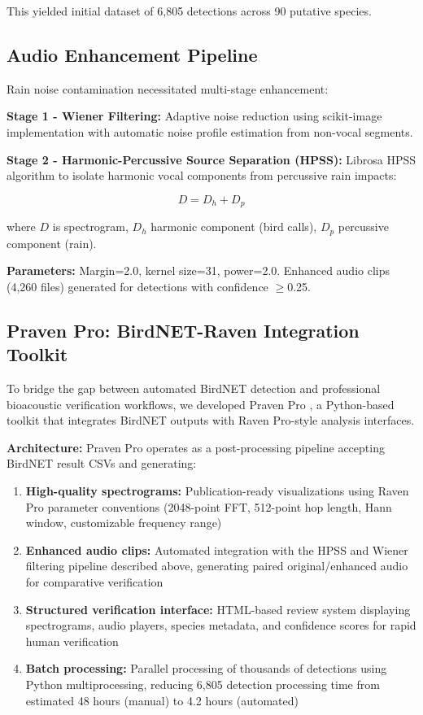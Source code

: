 \documentclass[twocolumn]{article}
\begin{document}
This yielded initial dataset of 6,805 detections across 90 putative species.

\subsection{Audio Enhancement Pipeline}

Rain noise contamination necessitated multi-stage enhancement:

\textbf{Stage 1 - Wiener Filtering:} Adaptive noise reduction using scikit-image implementation with automatic noise profile estimation from non-vocal segments.

\textbf{Stage 2 - Harmonic-Percussive Source Separation (HPSS):} Librosa HPSS algorithm \citep{Fitzgerald2010} to isolate harmonic vocal components from percussive rain impacts:

\begin{equation}
D = D_h + D_p
\end{equation}

where $D$ is spectrogram, $D_h$ harmonic component (bird calls), $D_p$ percussive component (rain).

\textbf{Parameters:} Margin=2.0, kernel size=31, power=2.0. Enhanced audio clips (4,260 files) generated for detections with confidence $\geq$0.25.

\subsection{Praven Pro: BirdNET-Raven Integration Toolkit}

To bridge the gap between automated BirdNET detection and professional bioacoustic verification workflows, we developed Praven Pro \citep{Redpath2025}, a Python-based toolkit that integrates BirdNET outputs with Raven Pro-style analysis interfaces.

\textbf{Architecture:} Praven Pro operates as a post-processing pipeline accepting BirdNET result CSVs and generating:

\begin{enumerate}
\item \textbf{High-quality spectrograms:} Publication-ready visualizations using Raven Pro parameter conventions (2048-point FFT, 512-point hop length, Hann window, customizable frequency range)

\item \textbf{Enhanced audio clips:} Automated integration with the HPSS and Wiener filtering pipeline described above, generating paired original/enhanced audio for comparative verification

\item \textbf{Structured verification interface:} HTML-based review system displaying spectrograms, audio players, species metadata, and confidence scores for rapid human verification

\item \textbf{Batch processing:} Parallel processing of thousands of detections using Python multiprocessing, reducing 6,805 detection processing time from estimated 48 hours (manual) to 4.2 hours (automated)
\end{enumerate}
\end{document}

